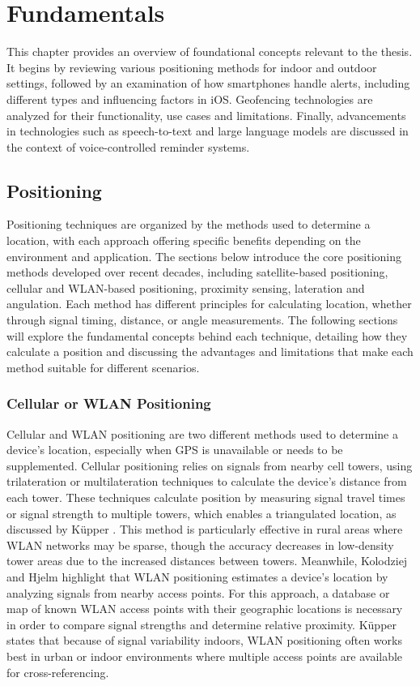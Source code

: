 \chapter{Fundamentals}
\label{cha:Fundamentals}

This chapter provides an overview of foundational concepts relevant to the thesis. It begins by reviewing various positioning methods for indoor and outdoor settings, followed by an examination of how smartphones handle alerts, including different types and influencing factors in iOS. Geofencing technologies are analyzed for their functionality, use cases and limitations. Finally, advancements in technologies such as speech-to-text and large language models are discussed in the context of voice-controlled reminder systems.

\section{Positioning}
Positioning techniques are organized by the methods used to determine a location, with each approach offering specific benefits depending on the environment and application. The sections below introduce the core positioning methods developed over recent decades, including satellite-based positioning, cellular and WLAN-based positioning, proximity sensing, lateration and angulation. Each method has different principles for calculating location, whether through signal timing, distance, or angle measurements. The following sections will explore the fundamental concepts behind each technique, detailing how they calculate a position and discussing the advantages and limitations that make each method suitable for different scenarios.

\subsection{Cellular or WLAN Positioning}
Cellular and WLAN positioning are two different methods used to determine a device's location, especially when GPS is unavailable or needs to be supplemented. Cellular positioning relies on signals from nearby cell towers, using trilateration or multilateration techniques to calculate the device's distance from each tower. These techniques calculate position by measuring signal travel times or signal strength to multiple towers, which enables a triangulated location, as discussed by K\"upper \cite{kupper2005location}. This method is particularly effective in rural areas where WLAN networks may be sparse, though the accuracy decreases in low-density tower areas due to the increased distances between towers.
Meanwhile, Kolodziej and Hjelm \cite{kolodziej2017local} highlight that WLAN positioning estimates a device's location by analyzing signals from nearby access points. For this approach, a database or map of known WLAN access points with their geographic locations is necessary in order to compare signal strengths and determine relative proximity. K\"upper \cite{kupper2005location} states that because of signal variability indoors, WLAN positioning often works best in urban or indoor environments where multiple access points are available for cross-referencing.

